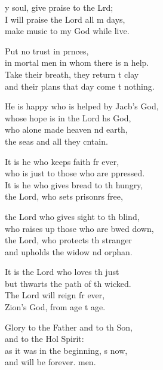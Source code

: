 \begin{psalmverse}
  \begin{patverse}
y soul, give praise to the Lrd;\Flex\\
I will praise the Lord all m days,\Med\\
make music to my God while  live.

Put no trust in pr\pointup{\i}nces,\Med\\
in mortal men in whom there is n help.\\
Take their breath, they return t clay\Med\\
and their plans that day come t nothing.

He is happy who is helped by Jacb’s God,\Med\\
whose hope is in the Lord h\pointup{\i}s God,\\
who alone made heaven nd earth,\Med\\
the seas and all they cntain.

It is he who keeps faith fr ever,\Med\\
who is just to those who are ppressed.\\
It is he who gives bread to th hungry,\Med\\
the Lord, who sets prisonrs free,

the Lord who gives sight to th blind,\Med\\
who raises up those who are bwed down,\\
the Lord, who protects th stranger\Med\\
and upholds the widow nd orphan.

It is the Lord who loves th just\Med\\
but thwarts the path of th wicked.\\
The Lord will reign fr ever,\Med\\
Zion’s God, from age t age.

Glory to the Father and to th Son,\Med\\
and to the Hol Spirit:\\
as it was in the beginning, \pointup{\i}s now,\Med\\
and will be forever. men. 
  \end{patverse}
\end{psalmverse}
